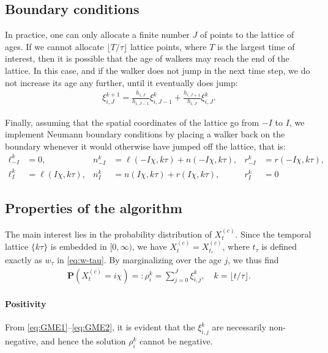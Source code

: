\documentclass[a4paper,12pt]{elsarticle}
\numberwithin{equation}{section}
\theoremstyle{plain}
\theoremstyle{definition}
\theoremstyle{remark}
\numberwithin{equation}{section}
\newcommand{\tim}{[0,\infty)}
\newcommand{\1}{\mathbf 1}
\newcommand{\pr}{\mathbf P}
\begin{document}
\subsection{Boundary conditions}
In practice, one can only allocate a finite number $J$ of points to the
lattice of ages.  If we cannot allocate
$\lfloor T/\tau \rfloor$ lattice points, where $T$ is the largest time of interest, then it is possible that the age of walkers may reach the end of the lattice. In this case, and if the walker does not jump in the next time step, we do not increase its age any further, until it eventually does jump:
\begin{align}
\xi^{k+1}_{i,J} = \frac{h_{i,J}}{h_{i,J-1}} \xi^k_{i,J-1}
+ \frac{h_{i,J+1}}{h_{i,J}} \xi^k_{i,J}.
\end{align}

Finally, assuming that the spatial coordinates of the lattice go from
$-I$ to $I$, we implement Neumann boundary conditions by placing a walker
back on the boundary whenever it would otherwise have jumped off the lattice,
that is:
\begin{align}
  \ell^k_{-I} &= 0, & n^k_{-I} &= \ell(-I\chi, k\tau) + n(-I\chi, k\tau),
  & r^k_{-I} &= r(-I\chi, k\tau),
  \\
  \ell^k_I &= \ell(I \chi, k\tau), & n^k_{I} &= n(I\chi, k\tau) + r(I\chi, k\tau),
  & r^k_{I} &= 0
\end{align}


\subsection{Properties of the algorithm}

The main interest lies in the probability distribution of $X^{(c)}_t$.
Since the temporal lattice $\{k\tau\}$ is embedded in $\tim$, we have
$X^{(c)}_t = X^{(c)}_{t_\tau}$, where $t_\tau$ is defined exactly as $w_\tau$ in \eqref{eq:w-tau}.  By marginalizing over the age $j$, we thus find
\begin{align}
  \pr(X^{(c)}_t = i\chi) =: \rho^k_i = \sum_{j=0}^J \xi^k_{i,j},
  \quad k = \lfloor t /\tau \rfloor.
\end{align}


\paragraph{Positivity}
From \eqref{eq:GME1}--\eqref{eq:GME2}, it is evident that the $\xi^k_{i,j}$ are
necessarily non-negative, and hence the solution $\rho^k_i$ cannot be negative.
\end{document}
